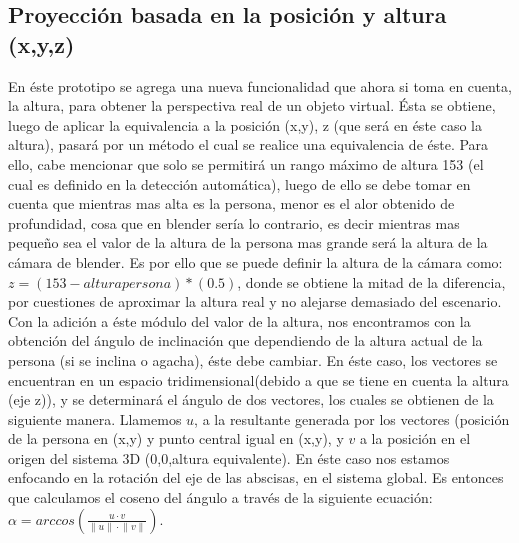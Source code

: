\documentclass[a4paper,openright,12pt]{report}
\begin{document}
\subsection{Proyección basada en la posición y altura (x,y,z)}
En éste prototipo se agrega una nueva funcionalidad que ahora si toma en cuenta, la altura, para obtener la perspectiva real de un objeto virtual. Ésta se obtiene, luego de aplicar la equivalencia a la posición (x,y), z (que será en éste caso la altura), pasará por un método el cual se realice una equivalencia de éste. Para ello, cabe mencionar que solo se permitirá un rango máximo de altura 153 (el cual es definido en la detección automática), luego de ello se debe tomar en cuenta que mientras mas alta es la persona, menor es el alor obtenido de profundidad, cosa que en blender sería lo contrario, es decir mientras mas pequeño sea el valor de la altura de la persona mas grande será la altura de la cámara de blender. Es por ello que se puede definir la altura de la cámara como: $z = (153 - altura persona)*(0.5)$, donde se obtiene la mitad de la diferencia, por cuestiones de aproximar la altura real y no alejarse demasiado del escenario.\\
Con la adición a éste módulo del valor de la altura, nos encontramos con la obtención del ángulo de inclinación que dependiendo de la altura actual de la persona (si se inclina o agacha), éste debe cambiar. En éste caso, los vectores se encuentran en un espacio tridimensional(debido a que se tiene en cuenta la altura (eje z)), y se determinará el ángulo de dos vectores, los cuales se obtienen de la siguiente manera. Llamemos $u$, a la resultante generada por los vectores (posición de la persona en (x,y) y punto central igual en (x,y), y $v$ a la posición en el origen del sistema 3D (0,0,altura equivalente). En éste caso nos estamos enfocando en la rotación del eje de las abscisas, en el sistema global. Es entonces que calculamos el coseno del ángulo a través de la siguiente ecuación: \(\alpha =arccos(\frac { u·v }{ \left\| u \right\| ·\left\| v \right\|  } )\).
\end{document}
